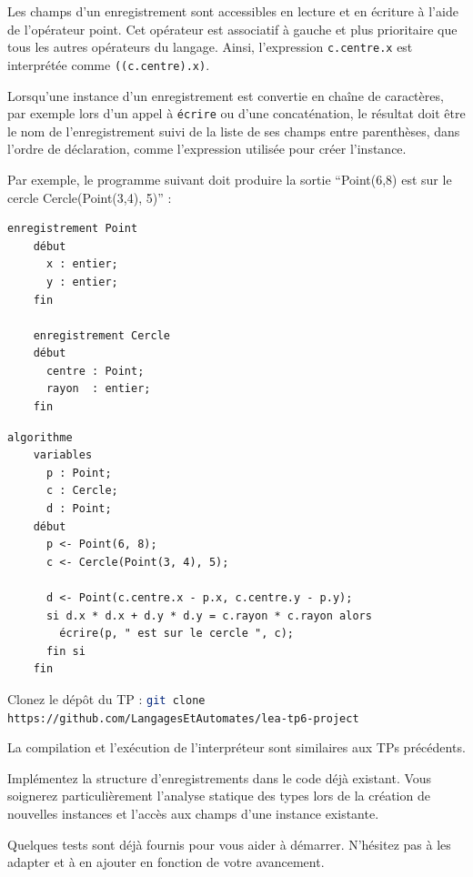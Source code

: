 \documentclass[livret]{td}
\begin{document}
Les champs d'un enregistrement sont accessibles en lecture et en écriture à l'aide de l'opérateur point.
Cet opérateur est associatif à gauche et plus prioritaire que tous les autres opérateurs du langage.
Ainsi, l'expression \lstinline{c.centre.x} est interprétée comme \lstinline{((c.centre).x)}.

Lorsqu'une instance d'un enregistrement est convertie en chaîne de caractères,
par exemple lors d'un appel à \lstinline{écrire} ou d'une concaténation,
le résultat doit être le nom de l'enregistrement suivi de la liste de ses
champs entre parenthèses, dans l'ordre de déclaration,
comme l'expression utilisée pour créer l'instance.

Par exemple, le programme suivant doit produire la sortie ``Point(6,8) est sur le cercle Cercle(Point(3,4), 5)'' :

\begin{minipage}{.3\textwidth}
  \begin{lstlisting}[gobble=2]
    enregistrement Point
    début
      x : entier;
      y : entier;
    fin
    
    enregistrement Cercle
    début
      centre : Point;
      rayon  : entier;
    fin
  \end{lstlisting}
\end{minipage}%
\begin{minipage}{.7\textwidth}
  \begin{lstlisting}[gobble=2]
    algorithme
    variables
      p : Point;
      c : Cercle;
      d : Point;
    début
      p <- Point(6, 8);
      c <- Cercle(Point(3, 4), 5);
    
      d <- Point(c.centre.x - p.x, c.centre.y - p.y);
      si d.x * d.x + d.y * d.y = c.rayon * c.rayon alors
        écrire(p, " est sur le cercle ", c);
      fin si
    fin
  \end{lstlisting}
\end{minipage}%

\vspace{-4mm}
\begin{exercice}

  \begin{question}
  \item Clonez le dépôt du TP : \lstinline[language=bash]{git clone https://github.com/LangagesEtAutomates/lea-tp6-project}

    La compilation et l'exécution de l'interpréteur sont similaires aux TPs précédents.

  \item Implémentez la structure d'enregistrements dans le code déjà existant.
    Vous soignerez particulièrement l'analyse statique des types lors de la création de
    nouvelles instances et l'accès aux champs d'une instance existante. 
    
  \item Quelques tests sont déjà fournis pour vous aider à démarrer.
    N'hésitez pas à les adapter et à en ajouter en fonction de votre avancement. 
    
  \end{question}

\end{exercice}
\end{document}
